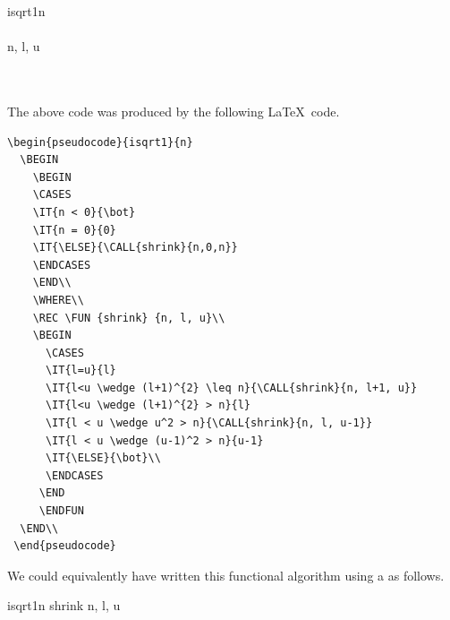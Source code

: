 \documentclass[a4]{article}
\begin{document}
\begin{pseudocode}{isqrt1}{n}
  \BEGIN
    \BEGIN
    \CASES
    \ENDCASES
    \END\\
    \WHERE\\
    \REC {} {n, l, u}\\
    \BEGIN
      \CASES
      \IT{\ELSE}{\bot}\\
      \ENDCASES
     \END
     \ENDFUN
  \END\\
\end{pseudocode}

The above code was produced by the following \LaTeX\ code.

\begin{verbatim}
\begin{pseudocode}{isqrt1}{n}
  \BEGIN
    \BEGIN
    \CASES
    \IT{n < 0}{\bot}
    \IT{n = 0}{0}
    \IT{\ELSE}{\CALL{shrink}{n,0,n}}
    \ENDCASES
    \END\\
    \WHERE\\
    \REC \FUN {shrink} {n, l, u}\\
    \BEGIN
      \CASES
      \IT{l=u}{l}
      \IT{l<u \wedge (l+1)^{2} \leq n}{\CALL{shrink}{n, l+1, u}}
      \IT{l<u \wedge (l+1)^{2} > n}{l}
      \IT{l < u \wedge u^2 > n}{\CALL{shrink}{n, l, u-1}}
      \IT{l < u \wedge (u-1)^2 > n}{u-1}
      \IT{\ELSE}{\bot}\\
      \ENDCASES
     \END
     \ENDFUN
  \END\\
 \end{pseudocode}  
\end{verbatim}

We could equivalently have written this functional algorithm using a
\LET as follows.

\begin{pseudocode}{isqrt1}{n}
  \LET 
  \REC \FUN
  {shrink} {n, l, u}
   \BEGIN
     \CASES
      \IT{\ELSE}{\bot}
      \ENDCASES
    \END\\
  \ENDFUN
   \IN
  \BEGIN
    \CASES
    \ENDCASES
  \END
 \end{pseudocode}
\end{document}
